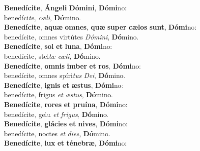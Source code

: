 \evenverse \textbf{Be}\textbf{ne}\textbf{dí}\textbf{ci}\textbf{te}, \textbf{Án}\textbf{ge}\textbf{li} \textbf{Dó}\textbf{mi}\textbf{ni}, \textbf{Dó}\textbf{mi}no:~\*\\
\evenverse benedíci\textit{te}, \textit{cæ}\textit{li}, \textbf{Dó}mino.\\
\oddverse \textbf{Be}\textbf{ne}\textbf{dí}\textbf{ci}\textbf{te}, \textbf{a}\textbf{quæ} \textbf{om}\textbf{nes}, \textbf{quæ} \textbf{su}\textbf{per} \textbf{cæ}\textbf{los} \textbf{sunt}, \textbf{Dó}\textbf{mi}no:~\*\\
\oddverse benedícite, omnes virtútes \textit{Dó}\textit{mi}\textit{ni}, \textbf{Dó}mino.\\
\evenverse \textbf{Be}\textbf{ne}\textbf{dí}\textbf{ci}\textbf{te}, \textbf{sol} \textbf{et} \textbf{lu}\textbf{na}, \textbf{Dó}\textbf{mi}no:~\*\\
\evenverse benedícite, stel\textit{læ} \textit{cæ}\textit{li}, \textbf{Dó}mino.\\
\oddverse \textbf{Be}\textbf{ne}\textbf{dí}\textbf{ci}\textbf{te}, \textbf{om}\textbf{nis} \textbf{im}\textbf{ber} \textbf{et} \textbf{ros}, \textbf{Dó}\textbf{mi}no:~\*\\
\oddverse benedícite, omnes spíri\textit{tus} \textit{De}\textit{i}, \textbf{Dó}mino.\\
\evenverse \textbf{Be}\textbf{ne}\textbf{dí}\textbf{ci}\textbf{te}, \textbf{i}\textbf{gnis} \textbf{et} \textbf{æ}\textbf{stus}, \textbf{Dó}\textbf{mi}no:~\*\\
\evenverse benedícite, frigus \textit{et} \textit{æ}\textit{stus}, \textbf{Dó}mino.\\
\oddverse \textbf{Be}\textbf{ne}\textbf{dí}\textbf{ci}\textbf{te}, \textbf{ro}\textbf{res} \textbf{et} \textbf{pru}\textbf{í}\textbf{na}, \textbf{Dó}\textbf{mi}no:~\*\\
\oddverse benedícite, gelu \textit{et} \textit{fri}\textit{gus}, \textbf{Dó}mino.\\
\evenverse \textbf{Be}\textbf{ne}\textbf{dí}\textbf{ci}\textbf{te}, \textbf{glá}\textbf{ci}\textbf{es} \textbf{et} \textbf{ni}\textbf{ves}, \textbf{Dó}\textbf{mi}no:~\*\\
\evenverse benedícite, noctes \textit{et} \textit{di}\textit{es}, \textbf{Dó}mino.\\
\oddverse \textbf{Be}\textbf{ne}\textbf{dí}\textbf{ci}\textbf{te}, \textbf{lux} \textbf{et} \textbf{té}\textbf{ne}\textbf{bræ}, \textbf{Dó}\textbf{mi}no:~\*\\
